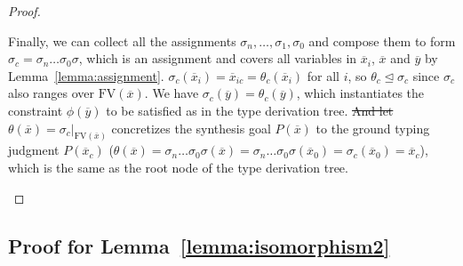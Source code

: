 \documentclass[manuscript,screen]{acmart}
\makeatletter
\newcommand{\mvhzc}{\text{FV}}
\providecommand{\DIFadd}[1]{{\protect\color{blue}\uwave{#1}}} %
\providecommand{\DIFdel}[1]{{\protect\color{red}\sout{#1}}} %
\providecommand{\DIFaddbegin}{} %
\providecommand{\DIFaddend}{} %
\providecommand{\DIFdelbegin}{} %
\providecommand{\DIFdelend}{} %
\providecommand{\DIFscaledelfig}{0.5}
\newlength{\DIFdelgraphicswidth} %
\newlength{\DIFdelgraphicsheight} %
\providecommand{\DIFaddincludegraphics}[2][]{{\color{blue}\fbox{\DIFOincludegraphics[#1]{#2}}}} %
\providecommand{\DIFdelincludegraphics}[2][]{%
\sbox{\DIFdelgraphicsbox}{\DIFOincludegraphics[#1]{#2}}%
\settoboxwidth{\DIFdelgraphicswidth}{\DIFdelgraphicsbox} %
\settoboxtotalheight{\DIFdelgraphicsheight}{\DIFdelgraphicsbox} %
\scalebox{\DIFscaledelfig}{%
\parbox[b]{\DIFdelgraphicswidth}{\usebox{\DIFdelgraphicsbox}\\[-\baselineskip] \rule{\DIFdelgraphicswidth}{0em}}\llap{\resizebox{\DIFdelgraphicswidth}{\DIFdelgraphicsheight}{%
\setlength{\unitlength}{\DIFdelgraphicswidth}%
\begin{picture}(1,1)%
\thicklines\linethickness{2pt} %
{\color[rgb]{1,0,0}\put(0,0){\framebox(1,1){}}}%
{\color[rgb]{1,0,0}\put(0,0){\line( 1,1){1}}}%
{\color[rgb]{1,0,0}\put(0,1){\line(1,-1){1}}}%
\end{picture}%
}\hspace*{3pt}}} %
} %
\DeclareRobustCommand{\DIFaddbegin}{\DIFOaddbegin \let\includegraphics\DIFaddincludegraphics} %
\DeclareRobustCommand{\DIFaddend}{\DIFOaddend \let\includegraphics\DIFOincludegraphics} %
\DeclareRobustCommand{\DIFdelbegin}{\DIFOdelbegin \let\includegraphics\DIFdelincludegraphics} %
\DeclareRobustCommand{\DIFdelend}{\DIFOaddend \let\includegraphics\DIFOincludegraphics} %
\let\sout@orig\sout %
\renewcommand{\sout}[1]{\ifmmode\text{\sout@orig{\ensuremath{#1}}}\else\sout@orig{#1}\fi} %
\makeatother
\begin{document}
\begin{proof}
\begin{itemize}
    \emergencystretch=0pt Finally, we can collect all the assignments $\sigma_n, \ldots, \sigma_1, \sigma_0$ and compose them to form $\sigma_c = \sigma_n \ldots \sigma_0\sigma$, which is an assignment and covers all variables in $\overline{x}_i$, $\overline{x}$ and $\overline{y}$ by Lemma~\ref{lemma:assignment}. $\sigma_c(\overline{x}_i)=\overline{x}_{ic}=\theta_c(\overline{x}_i)$ for all $i$, so $\theta_c \trianglelefteq \sigma_c$ since $\sigma_c$ also ranges over $\mvhzc(\overline{x})$.
    We have $\sigma_c(\overline{y}) = \theta_c(\overline{y})$, which instantiates the constraint $\phi(\overline{y})$ to be satisfied as in the type derivation tree. \DIFdelbegin \DIFdel{And let }\DIFdelend \DIFaddbegin \DIFadd{Here, }\DIFaddend $\theta(\overline{x}) = \sigma_c|_{\mvhzc(\overline{x})}$ concretizes the synthesis goal $P(\overline{x})$ to the ground typing judgment $P(\overline{x}_c)$ ($\theta(\overline{x})=\sigma_n \ldots \sigma_0\sigma(\overline{x})=\sigma_n \ldots \sigma_0\sigma(\overline{x}_0)=\sigma_c(\overline{x}_0)=\overline{x}_c$), which is the same as the root node of the type derivation tree.
  \end{itemize}
\end{proof}

\subsection{Proof for Lemma~\ref{lemma:isomorphism2}}
\label{sec:appendix-lemma4}
\end{document}
